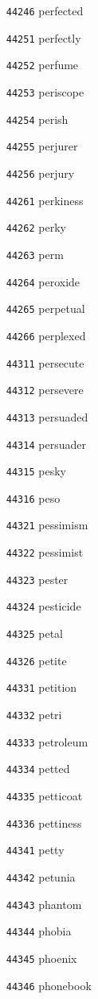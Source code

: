 \documentclass[twoside,11pt]{article}
\begin{document}
\begin{multicols}{5}
\begin{enumerate}
\item[\texttt{44246}] perfected
\item[\texttt{44251}] perfectly
\item[\texttt{44252}] perfume
\item[\texttt{44253}] periscope
\item[\texttt{44254}] perish
\item[\texttt{44255}] perjurer
\item[\texttt{44256}] perjury
\item[\texttt{44261}] perkiness
\item[\texttt{44262}] perky
\item[\texttt{44263}] perm
\item[\texttt{44264}] peroxide
\item[\texttt{44265}] perpetual
\item[\texttt{44266}] perplexed
\item[\texttt{44311}] persecute
\item[\texttt{44312}] persevere
\item[\texttt{44313}] persuaded
\item[\texttt{44314}] persuader
\item[\texttt{44315}] pesky
\item[\texttt{44316}] peso
\item[\texttt{44321}] pessimism
\item[\texttt{44322}] pessimist
\item[\texttt{44323}] pester
\item[\texttt{44324}] pesticide
\item[\texttt{44325}] petal
\item[\texttt{44326}] petite
\item[\texttt{44331}] petition
\item[\texttt{44332}] petri
\item[\texttt{44333}] petroleum
\item[\texttt{44334}] petted
\item[\texttt{44335}] petticoat
\item[\texttt{44336}] pettiness
\item[\texttt{44341}] petty
\item[\texttt{44342}] petunia
\item[\texttt{44343}] phantom
\item[\texttt{44344}] phobia
\item[\texttt{44345}] phoenix
\item[\texttt{44346}] phonebook

\end{enumerate}
\end{multicols}
\end{document}
